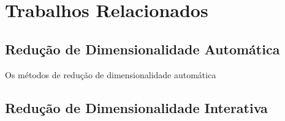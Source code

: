 \section{Trabalhos Relacionados}\label{sec:rel}

\subsection{Redução de Dimensionalidade Automática}

Os métodos de redução de dimensionalidade automática 

\subsection{Redução de Dimensionalidade Interativa}




